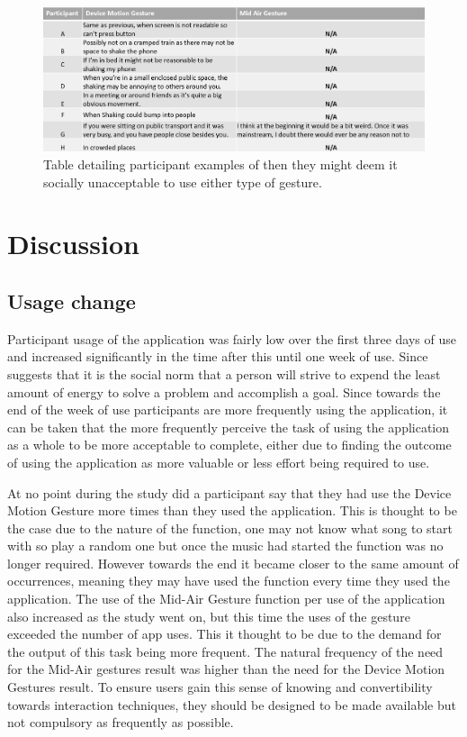 \documentclass{l4proj}
\begin{document}
\begin{figure}[!htb]
    \centering
    \includegraphics[width=\textwidth]{images/problems.PNG}
        \caption{Table detailing participant examples of then they might deem it socially unacceptable to use either type of gesture.}
        \label{fig:problems}
\end{figure}



\section{Discussion} 

\subsection{Usage change}

Participant usage of the application was fairly low over the first three days of use and increased significantly in the time after this until one week of use. Since \citet{zipf_human_2016} suggests that it is the social norm that a person will strive to expend the least amount of energy to solve a problem and accomplish a goal. Since towards the end of the week of use participants are more frequently using the application, it can be taken that the more frequently perceive the task of using the application as a whole to be more acceptable to complete, either due to finding the outcome of using the application as more valuable or less effort being required to use. 

At no point during the study did a participant say that they had use the Device Motion Gesture more times than they used the application. This is thought to be the case due to the nature of the function, one may not know what song to start with so play a random one but once the music had started the function was no longer required. However towards the end it became closer to the same amount of occurrences, meaning they may have used the function every time they used the application. The use of the Mid-Air Gesture function per use of the application also increased as the study went on, but this time the uses of the gesture exceeded the number of app uses. This it thought to be due to the demand for the output of this task being more frequent. The natural frequency of the need for the Mid-Air gestures result was higher than the need for the Device Motion Gestures result. To ensure users gain this sense of knowing and convertibility towards interaction techniques, they should be designed to be made available but not compulsory as frequently as possible.
\end{document}

